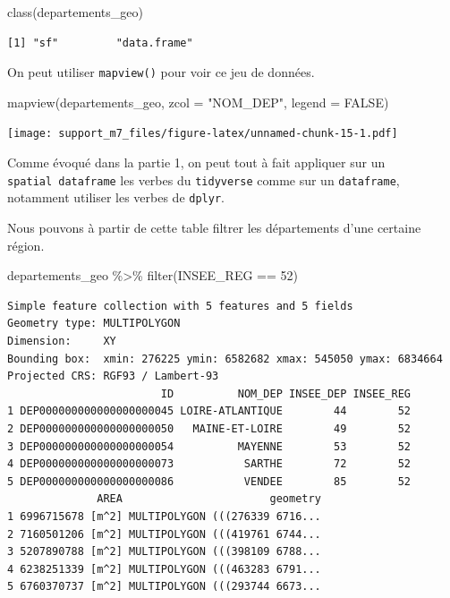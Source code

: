 \documentclass[
]{book}
\newenvironment{Shaded}{\begin{snugshade}}{\end{snugshade}}
\newcommand{\AttributeTok}[1]{\textcolor[rgb]{0.77,0.63,0.00}{#1}}
\newcommand{\ConstantTok}[1]{\textcolor[rgb]{0.00,0.00,0.00}{#1}}
\newcommand{\DecValTok}[1]{\textcolor[rgb]{0.00,0.00,0.81}{#1}}
\newcommand{\FunctionTok}[1]{\textcolor[rgb]{0.00,0.00,0.00}{#1}}
\newcommand{\NormalTok}[1]{#1}
\newcommand{\SpecialCharTok}[1]{\textcolor[rgb]{0.00,0.00,0.00}{#1}}
\newcommand{\StringTok}[1]{\textcolor[rgb]{0.31,0.60,0.02}{#1}}
\begin{document}
\begin{Shaded}
\begin{Highlighting}[]
\FunctionTok{class}\NormalTok{(departements\_geo)}
\end{Highlighting}
\end{Shaded}

\begin{verbatim}
[1] "sf"         "data.frame"
\end{verbatim}

On peut utiliser \texttt{mapview()} pour voir ce jeu de données.

\begin{Shaded}
\begin{Highlighting}[]
\FunctionTok{mapview}\NormalTok{(departements\_geo, }\AttributeTok{zcol =} \StringTok{"NOM\_DEP"}\NormalTok{, }\AttributeTok{legend =} \ConstantTok{FALSE}\NormalTok{)}
\end{Highlighting}
\end{Shaded}

\texttt{[image: support\_m7\_files/figure-latex/unnamed-chunk-15-1.pdf]}

Comme évoqué dans la partie 1, on peut tout à fait appliquer sur un \texttt{spatial\ dataframe} les verbes du \texttt{tidyverse} comme sur un \texttt{dataframe}, notamment utiliser les verbes de \texttt{dplyr}.

Nous pouvons à partir de cette table filtrer les départements d'une certaine région.

\begin{Shaded}
\begin{Highlighting}[]
\NormalTok{departements\_geo }\SpecialCharTok{\%\textgreater{}\%}
  \FunctionTok{filter}\NormalTok{(INSEE\_REG }\SpecialCharTok{==} \DecValTok{52}\NormalTok{)}
\end{Highlighting}
\end{Shaded}

\begin{verbatim}
Simple feature collection with 5 features and 5 fields
Geometry type: MULTIPOLYGON
Dimension:     XY
Bounding box:  xmin: 276225 ymin: 6582682 xmax: 545050 ymax: 6834664
Projected CRS: RGF93 / Lambert-93
                        ID          NOM_DEP INSEE_DEP INSEE_REG
1 DEP000000000000000000045 LOIRE-ATLANTIQUE        44        52
2 DEP000000000000000000050   MAINE-ET-LOIRE        49        52
3 DEP000000000000000000054          MAYENNE        53        52
4 DEP000000000000000000073           SARTHE        72        52
5 DEP000000000000000000086           VENDEE        85        52
              AREA                       geometry
1 6996715678 [m^2] MULTIPOLYGON (((276339 6716...
2 7160501206 [m^2] MULTIPOLYGON (((419761 6744...
3 5207890788 [m^2] MULTIPOLYGON (((398109 6788...
4 6238251339 [m^2] MULTIPOLYGON (((463283 6791...
5 6760370737 [m^2] MULTIPOLYGON (((293744 6673...
\end{verbatim}
\end{document}

